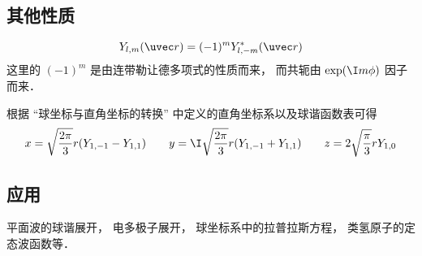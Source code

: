 \subsection{其他性质}
\begin{equation}\label{SphHar_eq6}
Y_{l,m}(\uvec r) = (-1)^m Y_{l,-m}^*(\uvec r)
\end{equation}
这里的 $(-1)^m$ 是由连带勒让德多项式的性质而来， 而共轭由 $\exp(\I m\phi)$ 因子而来．

根据 “球坐标与直角坐标的转换” 中定义的直角坐标系以及球谐函数表可得
\begin{equation}\label{SphHar_eq4}
x = \sqrt{\frac{2\pi}{3}} r (Y_{1,-1} - Y_{1,1}) \qquad
y = \I \sqrt{\frac{2\pi}{3}} r (Y_{1,-1}+Y_{1,1}) \qquad
z =2\sqrt{\frac{\pi}{3}} rY_{1,0}
\end{equation}

\subsection{应用}
平面波的球谐展开， 电多极子展开， 球坐标系中的拉普拉斯方程， 类氢原子的定态波函数等．
